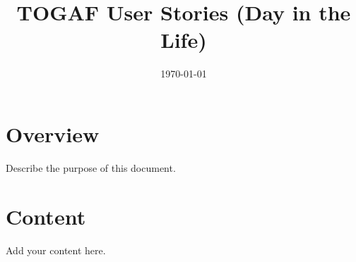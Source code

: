 \documentclass[11pt]{article}
\title{TOGAF User Stories (Day in the Life)}
\author{}
\date{\today}
\begin{document}
\maketitle

\section{Overview}
Describe the purpose of this document.

\section{Content}
Add your content here.
\end{document}
